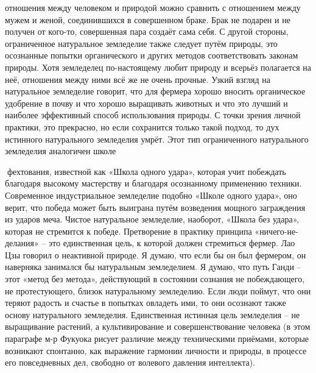 \documentclass[a4paper]{book}
\begin{document}
отношения между человеком и природой можно сравнить с отношением между мужем и
женой, соединившихся в совершенном браке. Брак не подарен и не получен от кого-то,
совершенная пара создаёт сама себя.
С другой стороны, ограниченное натуральное земледелие также следует путём природы,
это осознанные попытки органического и других методов соответствовать законам природы.
Хотя земледелец по-настоящему любит природу и всерьёз полагается на неё, отношения
между ними всё же не очень прочные.
Узкий взгляд на натуральное земледелие говорит, что для фермера хорошо вносить
органическое удобрение в почву и что хорошо выращивать животных и что это лучший и
наиболее эффективный способ использования природы. С точки зрения личной практики,
это прекрасно, но если сохранится только такой подход, то дух истинного натурального
земледелия умрёт. Этот тип ограниченного натурального земледелия аналогичен школе

фехтования, известной как «Школа одного удара», которая учит побеждать благодаря
высокому мастерству и благодаря осознанному применению техники. Современное
индустриальное земледелие подобно «Школе одного удара», оно верит, что победа может
быть выиграна путём возведения мощного заграждения из ударов меча.
Чистое натуральное земледелие, наоборот, «Школа без удара», которая не стремится к
победе. Претворение в практику принципа «ничего-не-делания» – это единственная цель, к
которой должен стремиться фермер. Лао Цзы говорил о неактивной природе. Я думаю, что
если бы он был фермером, он наверняка занимался бы натуральным земледелием. Я думаю,
что путь Ганди – этот «метод без метода», действующий в состоянии сознания не
побеждающего, не протестующего, близок натуральному земледелию. Если люди поймут, что
они теряют радость и счастье в попытках овладеть ими, то они осознают также основу
натурального земледелия. Единственная истинная цель земледелия – не выращивание
растений, а культивирование и совершенствование человека (в этом параграфе м-р Фукуока
рисует различие между техническими приёмами, которые возникают спонтанно, как
выражение гармонии личности и природы, в процессе его повседневных дел, свободно от
волевого давления интеллекта).
\end{document}
